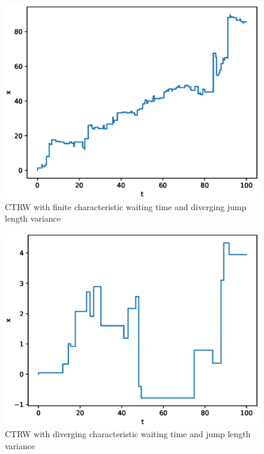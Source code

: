 \documentclass[aps, pre, preprint, amsmath, amssymb]{revtex4}
\begin{document}
\begin{figure}[H]
\centering	
\includegraphics[scale=0.5]{figures/ctrw3}	
\caption{CTRW with finite characteristic waiting time and diverging jump length variance}
\end{figure}
\begin{figure}[H]
\centering	
\includegraphics[scale=0.5]{figures/ctrw4}	
\caption{CTRW with diverging characteristic waiting time and jump length variance}
\end{figure}
\end{document}
